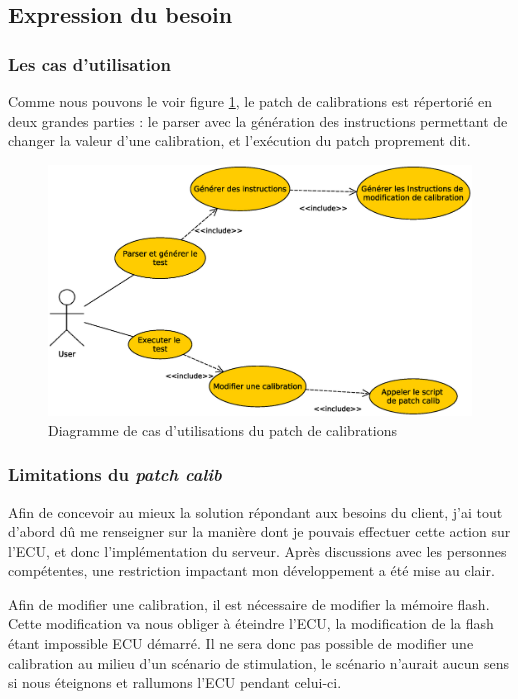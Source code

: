 \subsection{Expression du besoin}\label{besoin-patch}
\subsubsection{Les cas d'utilisation}
		Comme nous pouvons le voir figure \ref{fig:patch-cal-usecase}, le patch de calibrations est répertorié en deux grandes parties : le parser avec la génération des instructions permettant de changer la valeur d'une calibration, et l'exécution du patch proprement dit.
		\begin{figure}[H]
			\centering
			\includegraphics[width=12cm]{contents/images/patch-cal_usecase.eps}
			\caption{Diagramme de cas d'utilisations du patch de calibrations}
			\label{fig:patch-cal-usecase}
		\end{figure}

		\subsubsection{Limitations du \textit{patch calib}}\label{ecustop}
		Afin de concevoir au mieux la solution répondant aux besoins du client, j'ai tout d'abord dû me renseigner sur la manière dont je pouvais effectuer cette action sur l'ECU, et donc l'implémentation du serveur. Après discussions avec les personnes compétentes, une restriction impactant mon développement a été mise au clair.
		
		Afin de modifier une calibration, il est nécessaire de modifier la mémoire flash. Cette modification va nous obliger à éteindre l'ECU, la modification de la flash étant impossible ECU démarré. Il ne sera donc pas possible de modifier une calibration au milieu d'un scénario de stimulation, le scénario n'aurait aucun sens si nous éteignons et rallumons l'ECU pendant celui-ci.
		
